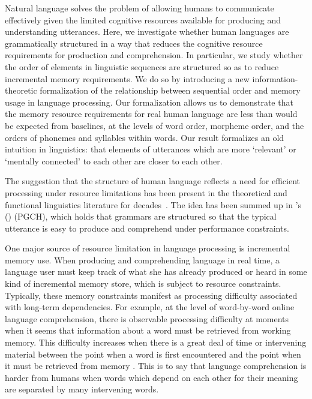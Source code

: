 
Natural language solves the problem of allowing humans to communicate effectively given the limited cognitive resources available for producing and understanding utterances. Here, we investigate whether human languages are grammatically structured in a way that reduces the cognitive resource requirements for production and comprehension. In particular, we study whether the order of elements in linguistic sequences are structured so as to reduce incremental memory requirements. We do so by introducing a new information-theoretic formalization of the relationship between sequential order and memory usage in language processing. Our formalization allows us to demonstrate that the memory resource requirements for real human language are less than would be expected from baselines, at the levels of word order, morpheme order, and the orders of phonemes and syllables within words. Our result formalizes an old intuition in linguistics: that elements of utterances which are more `relevant' or `mentally connected' to each other are closer to each other.

The suggestion that the structure of human language reflects a need for efficient processing under resource limitations has been present in the theoretical and functional linguistics literature for decades~\citep{yngve1961,berwick1984grammatical,hawkins1994performance,jaeger2011language,chomsky2005three,gibson2019efficiency}. The idea has been summed up in \citeauthor{hawkins1994efficiency}'s (\citeyear{hawkins1994efficiency})  (PGCH), which holds that grammars are structured so that the typical utterance is easy to produce and comprehend under performance constraints.

One major source of resource limitation in language processing is incremental memory use. 
When producing and comprehending language in real time, a language user must keep track of what she has already produced or heard in some kind of incremental memory store, which is subject to resource constraints.
Typically, these memory constraints manifest as processing difficulty associated with long-term dependencies.
For example, at the level of word-by-word online language comprehension, there is observable processing difficulty at moments when it seems that information about a word must be retrieved from working memory. 
This difficulty increases when there is a great deal of time or intervening material between the point when a word is first encountered and the point when it must be retrieved from memory  \citep{gibson1998syntactic,gibson1999memory,gibson2000dependency,mcelree,lewis2005activationbased,bartek2011search,nicenboim2015working}. 
This is to say that language comprehension is harder from humans when words which depend on each other for their meaning are separated by many intervening words.

